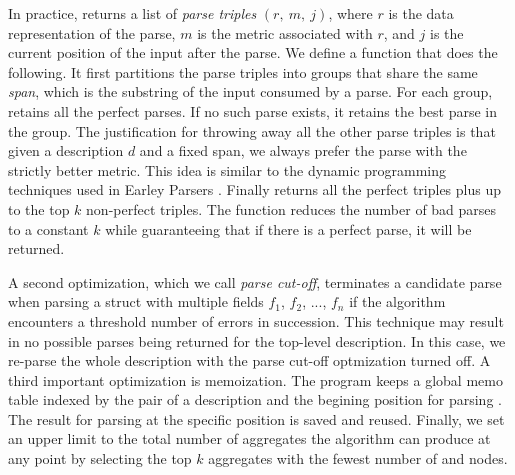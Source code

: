 In practice,  returns a list of
{\em parse triples} $(r,~m,~j)$, where $r$ is the data representation of
the parse, $m$ is the metric associated with $r$, and
$j$ is the current position of the input after the parse.
We define a  function that does the following.
It first partitions the parse triples into groups that share the same
{\em span}, which is the substring of the input consumed by a parse.
For each group,  retains all the perfect parses. If 
no such parse exists, it retains the best parse in the group. 
The justification for throwing away all the other parse triples
is that given a description $d$ and a fixed span, we always
prefer the parse with the strictly better metric. This idea is
similar to the dynamic programming techniques used in 
Earley Parsers \cite{earley-parser}. Finally  returns all
the perfect triples plus up to the top $k$ non-perfect triples.
The  function reduces the number of bad parses 
to a constant $k$ while guaranteeing that if there is a
perfect parse, it will be returned. 

A second optimization, which we call {\em parse cut-off}, terminates a
candidate parse when parsing a struct with multiple
fields $f_1$, $f_2$, ..., $f_n$ if the algorithm encounters 
a threshold number of errors in succession. 
This technique may result in no possible parses being returned for the
top-level description.  In this case, we re-parse the whole
description with the parse cut-off optmization turned off. 
A third important optimization is memoization.
The program keeps a global memo table indexed by the pair of a
description  and the begining position for parsing .
The result for parsing  at the specific position
is saved and reused. 
Finally, we set an upper limit to the total number of aggregates the
algorithm can produce at any point by selecting the top
$k$ aggregates with the fewest number of  and 
nodes. 


